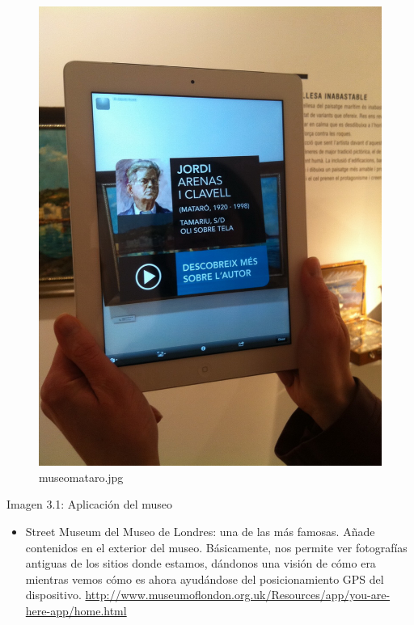 \begin{figure}[htbp]
\centering
\includegraphics{images/image02.jpg}
\caption{museomataro.jpg}
\end{figure}

Imagen 3.1: Aplicación del museo

\begin{itemize}
\itemsep1pt\parskip0pt
\item
  Street Museum del Museo de Londres: una de las más famosas. Añade
  contenidos en el exterior del museo. Básicamente, nos permite ver
  fotografías antiguas de los sitios donde estamos, dándonos una visión
  de cómo era mientras vemos cómo es ahora ayudándose del
  posicionamiento GPS del dispositivo.
  \href{https://www.google.com/url?q=http://www.museumoflondon.org.uk/Resources/app/you-are-here-app/home.html\&sa=D\&ust=1464634042348000\&usg=AFQjCNGdJb_A_77n_DSENri1i1G4Bq7zGw}{http://www.museumoflondon.org.uk/Resources/app/you-are-here-app/home.html}
\end{itemize}

